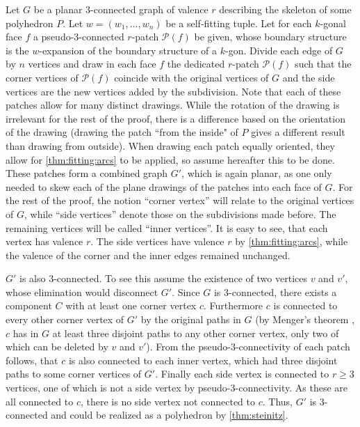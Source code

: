 \begin{construction}\label{thm:construction:patch}
  Let $G$ be a planar $3$-connected graph of valence $r$ describing the skeleton of some polyhedron $P$. Let $w = (w_1, \dots, w_n)$ be a self-fitting tuple. Let for each $k$-gonal face $f$ a pseudo-$3$-connected $r$-patch $\mathcal{P}(f)$ be given, whose boundary structure is the $w$-expansion of the boundary structure of a $k$-gon. Divide each edge of $G$ by $n$ vertices and draw in each face $f$ the dedicated $r$-patch $\mathcal{P}(f)$ such that the corner vertices of $\mathcal{P}(f)$ coincide with the original vertices of $G$ and the side vertices are the new vertices added by the subdivision. Note that each of these patches allow for many distinct drawings. While the rotation of the drawing is irrelevant for the rest of the proof, there is a difference based on the orientation of the drawing (drawing the patch ``from the inside" of $P$ gives a different result than drawing from outside). When drawing each patch equally oriented, they allow for \autoref{thm:fitting:arcs} to be applied, so assume hereafter this to be done. These patches form a combined graph $G'$, which is again planar, as one only needed to skew each of the plane drawings of the patches into each face of $G$. For the rest of the proof, the notion ``corner vertex'' will relate to the original vertices of $G$, while ``side vertices'' denote those on the subdivisions made before. The remaining vertices will be called ``inner vertices''. It is easy to see, that each vertex has valence $r$. The side vertices have valence $r$ by \autoref{thm:fitting:arcs}, while the valence of the corner and the inner edges remained unchanged.

$G'$ is also $3$-connected. To see this assume the existence of two vertices $v$ and $v'$, whose elimination would disconnect $G'$. Since $G$ is $3$-connected, there exists a component $C$ with at least one corner vertex $c$. Furthermore $c$ is connected to every other corner vertex of $G'$ by the original paths in $G$ (by Menger's theorem \cite{menger}, $c$ has in $G$ at least three disjoint paths to any other corner vertex, only two of which can be deleted by $v$ and $v'$). From the pseudo-$3$-connectivity of each patch follows, that $c$ is also connected to each inner vertex, which had three disjoint paths to some corner vertices of $G'$. Finally each side vertex is connected to $r \geq 3$ vertices, one of which is not a side vertex by pseudo-$3$-connectivity. As these are all connected to $c$, there is no side vertex not connected to $c$. Thus, $G'$ is $3$-connected and could be realized as a polyhedron by \autoref{thm:steinitz}.
\end{construction}

